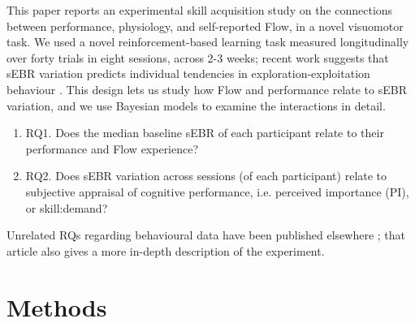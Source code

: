 \documentclass[10pt,letterpaper,floatsintext]{article}
\begin{document}
This paper reports an experimental skill acquisition study on the connections between performance, physiology, and self-reported Flow, in a novel visuomotor task. We used a novel reinforcement-based learning task measured longitudinally over forty trials in eight sessions, across 2-3 weeks; recent work suggests that sEBR variation predicts individual tendencies in exploration-exploitation behaviour \citep{Slooten2019}. This design lets us study how Flow and performance relate to sEBR variation, and we use Bayesian models to examine the interactions in detail. %


\begin{enumerate}
	\item RQ1. Does the median baseline sEBR of each participant relate to their performance and Flow experience?

	\item RQ2. Does sEBR variation across sessions (of each participant) relate to subjective appraisal of cognitive performance, i.e. perceived importance (PI), or skill:demand?

\end{enumerate}

Unrelated RQs regarding behavioural data have been published elsewhere \citep{Cowley2019flow}; that article also gives a more in-depth description of the experiment.

\section{Methods}
\end{document}
